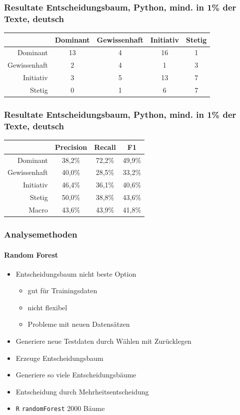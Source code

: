 \documentclass{beamer}
\begin{document}
\begin{frame}
\frametitle{Resultate Entscheidungsbaum, Python, mind. in 1\% der Texte, deutsch}
\begin{center}
\begin{tabular}{r|c|c|c|c|}
 &  Dominant  & Gewissenhaft & Initiativ & Stetig\\
\hline
Dominant &     13 & 4 & 16 & 1 \\
Gewissenhaft & 2 & 4 & 1 & 3\\
Initiativ &    3 & 5 & 13 & 7\\
Stetig &       0 & 1 & 6 & 7
\end{tabular}
\end{center}
\end{frame}
\begin{frame}
\frametitle{Resultate Entscheidungsbaum, Python, mind. in 1\% der Texte, deutsch}
\begin{center}
\begin{tabular}{r|c|c|c|}
 &  Precision  & Recall & F1 \\
\hline
Dominant     & 38,2\% & 72,2\% & 49,9\% \\
Gewissenhaft & 40,0\% & 28,5\% & 33,2\% \\
Initiativ    & 46,4\% & 36,1\% & 40,6\% \\
Stetig       & 50,0\% & 38,8\% & 43,6\% \\
\hline
Macro        & 43,6\% & 43,9\% & 41,8\%
\end{tabular}
\end{center}
\end{frame}
\begin{frame}
\frametitle{Analysemethoden}
\framesubtitle{Random Forest}
\begin{itemize}\setlength\parskip{12pt}
\item Entscheidungsbaum nicht beste Option
\begin{itemize}
	\item gut für Trainingsdaten
	\item nicht flexibel 
	\item Probleme mit neuen Datensätzen
\end{itemize}
\item Generiere neue Testdaten durch Wählen mit Zurücklegen
\item Erzeuge Entscheidungsbaum
\item Generiere so viele Entscheidungsbäume
\item Entscheidung durch Mehrheitsentscheidung
\item \texttt{R} \texttt{randomForest} 2000 Bäume
\end{itemize}
\end{frame}
\end{document}
